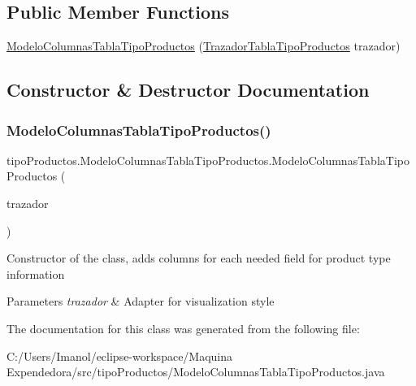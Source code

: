 \subsection*{Public Member Functions}
\begin{DoxyCompactItemize}
\item 
\mbox{\hyperlink{classtipo_productos_1_1_modelo_columnas_tabla_tipo_productos_ab34d4bdf545b10446daa43a9d9e5cd12}{Modelo\+Columnas\+Tabla\+Tipo\+Productos}} (\mbox{\hyperlink{classtipo_productos_1_1_trazador_tabla_tipo_productos}{Trazador\+Tabla\+Tipo\+Productos}} trazador)
\end{DoxyCompactItemize}


\subsection{Constructor \& Destructor Documentation}
\mbox{\label{classtipo_productos_1_1_modelo_columnas_tabla_tipo_productos_ab34d4bdf545b10446daa43a9d9e5cd12}} 
\subsubsection{\texorpdfstring{Modelo\+Columnas\+Tabla\+Tipo\+Productos()}{ModeloColumnasTablaTipoProductos()}}
{\footnotesize\ttfamily tipo\+Productos.\+Modelo\+Columnas\+Tabla\+Tipo\+Productos.\+Modelo\+Columnas\+Tabla\+Tipo\+Productos (\begin{DoxyParamCaption}\item[{\mbox{\hyperlink{classtipo_productos_1_1_trazador_tabla_tipo_productos}{Trazador\+Tabla\+Tipo\+Productos}}}]{trazador }\end{DoxyParamCaption})}

Constructor of the class, adds columns for each needed field for product type information 
\begin{DoxyParams}{Parameters}
{\em trazador} & Adapter for visualization style \\
\hline
\end{DoxyParams}


The documentation for this class was generated from the following file\+:\begin{DoxyCompactItemize}
\item 
C\+:/\+Users/\+Imanol/eclipse-\/workspace/\+Maquina Expendedora/src/tipo\+Productos/Modelo\+Columnas\+Tabla\+Tipo\+Productos.\+java\end{DoxyCompactItemize}
